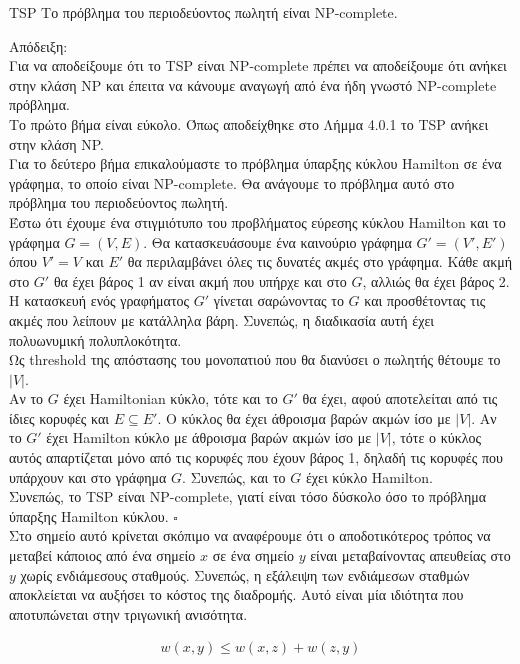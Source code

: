 \documentclass[oneside,12pt]{book}
\theoremstyle{definition}
\begin{document}
\begin{mylemma}{TSP}{}
	Tο πρόβλημα του περιοδεύοντος πωλητή είναι NP-complete.
\end{mylemma}

Απόδειξη: \\
Για να αποδείξουμε ότι το TSP είναι NP-complete πρέπει να αποδείξουμε ότι ανήκει στην κλάση NP και έπειτα να κάνουμε αναγωγή από ένα ήδη γνωστό NP-complete πρόβλημα. \\
Το πρώτο βήμα είναι εύκολο. Όπως αποδείχθηκε στο Λήμμα 4.0.1 το TSP ανήκει στην κλάση NP. \\
Για το δεύτερο βήμα επικαλούμαστε το πρόβλημα ύπαρξης κύκλου Hamilton σε ένα γράφημα, το οποίο είναι NP-complete. Θα ανάγουμε το πρόβλημα αυτό στο πρόβλημα του περιοδεύοντος πωλητή. \\
Έστω ότι έχουμε ένα στιγμιότυπο του προβλήματος εύρεσης κύκλου Hamilton και το γράφημα \(G = (V,E)\). Θα κατασκευάσουμε ένα καινούριο γράφημα \(G' = (V',E')\) όπου \(V' = V\) και \(E'\) θα περιλαμβάνει όλες τις δυνατές ακμές στο γράφημα. Κάθε ακμή στο \(G'\) θα έχει βάρος 1 αν είναι ακμή που υπήρχε και στο \(G\), αλλιώς θα έχει βάρος 2. Η κατασκευή ενός γραφήματος \(G'\) γίνεται σαρώνοντας το \(G\) και προσθέτοντας τις ακμές που λείπουν με κατάλληλα βάρη. Συνεπώς, η διαδικασία αυτή έχει πολυωνυμική πολυπλοκότητα. \\
Ως threshold της απόστασης του μονοπατιού που θα διανύσει ο πωλητής θέτουμε το \(|V|\). \\
Αν το \(G\) έχει Hamiltonian κύκλο, τότε και το \(G'\) θα έχει, αφού αποτελείται από τις ίδιες κορυφές και \(Ε \subseteq E'\). Ο κύκλος θα έχει άθροισμα βαρών ακμών ίσο με \(|V|\).
Αν το \(G'\) έχει Hamilton κύκλο με άθροισμα βαρών ακμών ίσο με \(|V|\), τότε ο κύκλος αυτός απαρτίζεται μόνο από τις κορυφές που έχουν βάρος 1, δηλαδή τις κορυφές που υπάρχουν και στο γράφημα \(G\). Συνεπώς, και το \(G\) έχει κύκλο Hamilton. \\
Συνεπώς, το TSP είναι NP-complete, γιατί είναι τόσο δύσκολο όσο το πρόβλημα ύπαρξης Hamilton κύκλου. \(\square\) \\

Στο σημείο αυτό κρίνεται σκόπιμο να αναφέρουμε ότι ο αποδοτικότερος τρόπος να μεταβεί κάποιος από ένα σημείο \(x\) σε ένα σημείο \(y\) είναι μεταβαίνοντας απευθείας στο \(y\) χωρίς ενδιάμεσους σταθμούς. Συνεπώς, η εξάλειψη των ενδιάμεσων σταθμών αποκλείεται να αυξήσει το κόστος της διαδρομής. Αυτό είναι μία ιδιότητα που αποτυπώνεται στην τριγωνική ανισότητα.

\begin{align*}
	w(x,y) \leq w(x,z) + w(z,y)
\end{align*}
\end{document}
